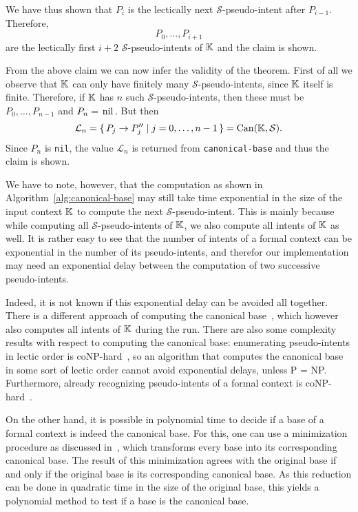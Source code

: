\begin{Proof}
  We have thus shown that $P_i$ is the lectically next $\mathcal{S}$-pseudo-intent after
  $P_{i-1}$.  Therefore,
  \begin{equation*}
    P_0, \dots, P_{i+1}
  \end{equation*}
  are the lectically first $i+2$ $\mathcal{S}$-pseudo-intents of ${\mathbb{K}}$ and the claim is
  shown.

  From the above claim we can now infer the validity of the theorem.  First of all we
  observe that ${\mathbb{K}}$ can only have finitely many $\mathcal{S}$-pseudo-intents, since
  ${\mathbb{K}}$ itself is finite.  Therefore, if ${\mathbb{K}}$ has $n$ such
  $\mathcal{S}$-pseudo-intents, then these must be $P_0, \dots, P_{n-1}$ and $P_n =
  \text{\lstinline{nil}}$.  But then
  \begin{equation*}
    \mathcal{L}_n = {\{\, P_j \to P_j'' \mid j = 0, \dots, n - 1\,\}} = \operatorname{Can}({\mathbb{K}}, \mathcal{S}).
  \end{equation*}
  Since $P_n$ is \lstinline{nil}, the value $\mathcal{L}_n$ is returned from
  \lstinline{canonical-base} and thus the claim is shown.
\end{Proof}

We have to note, however, that the computation as shown in
Algorithm~\ref{alg:canonical-base} may still take time exponential in the size of the
input context ${\mathbb{K}}$ to compute the next $\mathcal{S}$-pseudo-intent.  This is mainly
because while computing all $\mathcal{S}$-pseudo-intents of ${\mathbb{K}}$, we also compute all
intents of ${\mathbb{K}}$ as well.  It is rather easy to see that the number of intents of a
formal context can be exponential in the number of its pseudo-intents, and therefor our
implementation may need an exponential delay between the computation of two successive
pseudo-intents.

Indeed, it is not known if this exponential delay can be avoided all together.  There is a
different approach of computing the canonical base~\cite{DBLP:journals/amai/ObiedkovD07},
which however also computes all intents of ${\mathbb{K}}$ during the run.  There are also some
complexity results with respect to computing the canonical base: enumerating
pseudo-intents in lectic order is coNP-hard~\cite{DBLP:conf/icfca/Distel10}, so an
algorithm that computes the canonical base in some sort of lectic order cannot avoid
exponential delays, unless P = NP.  Furthermore, already recognizing pseudo-intents of a
formal context is coNP-hard~\cite{DBLP:journals/dam/BabinK13}.

On the other hand, it is possible in polynomial time to decide if a base of a formal
context is indeed the canonical base.  For this, one can use a minimization procedure as
discussed in~\cite{DBLP:conf/icfca/Rudolph07}, which transforms every base into its
corresponding canonical base.  The result of this minimization agrees with the original
base if and only if the original base is its corresponding canonical base.  As this
reduction can be done in quadratic time in the size of the original base, this yields a
polynomial method to test if a base is the canonical base.

